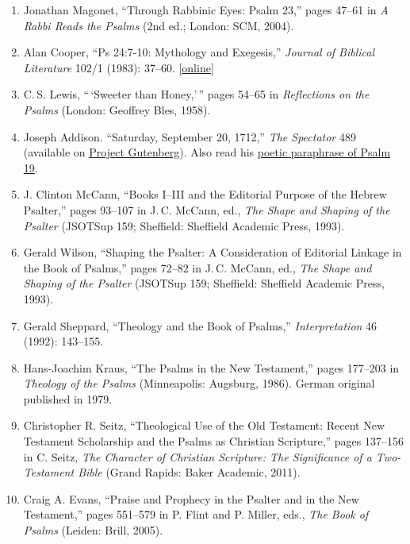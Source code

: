 \documentclass[titlepage]{article}
\begin{document}
\begin{enumerate}
  \item Jonathan Magonet, “Through Rabbinic Eyes: Psalm 23,” pages 47–61 in \emph{A Rabbi Reads the Psalms} (2nd ed.; London: SCM, 2004).

  \item Alan Cooper, ``Ps 24:7-10: Mythology and Exegesis,'' \emph{Journal of Biblical Literature} 102/1 (1983): 37--60. [\href{http://www.jstor.org/stable/3260745}{online}]

  \item C.\,S. Lewis, ``\,`Sweeter than Honey,'\,'' pages 54--65 in \emph{Reflections on the Psalms} (London: Geoffrey Bles, 1958).

  \item Joseph Addison. ``Saturday, September 20, 1712,'' \emph{The Spectator} 489 (available on \href{http://www.gutenberg.org/files/12030/12030-h/SV3/Spectator3.html#section489}{Project Gutenberg}). Also read his \href{http://cyberhymnal.org/htm/s/p/spacious.htm}{poetic paraphrase of Psalm 19}.

  \item J. Clinton McCann, “Books I–III and the Editorial Purpose of the Hebrew Psalter,” pages 93–107 in J.\,C. McCann, ed., \emph{The Shape and Shaping of the Psalter} (JSOTSup 159; Sheffield: Sheffield Academic Press, 1993).

  \item Gerald Wilson, “Shaping the Psalter: A Consideration of Editorial Linkage in the Book of Psalms,” pages 72–82 in J.\,C. McCann, ed., \emph{The Shape and Shaping of the Psalter} (JSOTSup 159; Sheffield: Sheffield Academic Press, 1993).

  \item Gerald Sheppard, “Theology and the Book of Psalms,” \emph{Interpretation} 46 (1992): 143–155.

  \item Hans-Joachim Kraus, “The Psalms in the New Testament,” pages 177–203 in \emph{Theology of the Psalms} (Minneapolis: Augsburg, 1986). German original published in 1979.

  \item Christopher R. Seitz, ``Theological Use of the Old Testament: Recent New Testament Scholarship and the Psalms as Christian Scripture,'' pages 137--156 in C. Seitz, \emph{The Character of Christian Scripture: The Significance of a Two-Testament Bible} (Grand Rapids: Baker Academic, 2011).

  \item Craig A. Evans, “Praise and Prophecy in the Psalter and in the New Testament,” pages 551--579 in P. Flint and P. Miller, eds., \emph{The Book of Psalms} (Leiden: Brill, 2005).


\end{enumerate}
\end{document}
